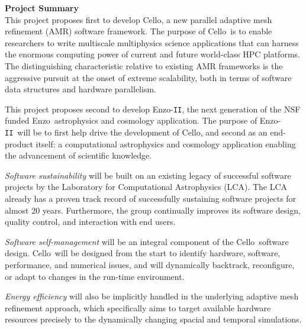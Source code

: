 \documentclass[11pt,letterpaper]{article}
\newcommand{\cello}{\textsf{Cello}}
\newcommand{\enzo}{\textsf{Enzo}}
\newcommand{\enzoii}{\textsf{Enzo}-\texttt{II}}
\begin{document}
\textbf{Project Summary} \\

%
%
%
%
This project proposes first to develop \cello, a new parallel adaptive
mesh refinement (AMR) software framework.  The purpose of \cello\ is
to enable researchers to write multiscale multiphysics science
applications that can harness the enormous computing power of current
and future world-class HPC platforms.  The distinguishing
characteristic relative to existing AMR frameworks is the aggressive
pursuit at the onset of extreme scalability, both in terms of software
data structures and hardware parallelism.

This project proposes second to develop \enzoii, the next generation
of the NSF funded \enzo\ astrophysics and cosmology application.  The
purpose of \enzoii\ will be to first help drive the development of
\cello, and second as an end-product itself: a computational
astrophysics and cosmology application enabling the advancement of
scientific knowledge.

\textit{Software sustainability} will be built on an existing legacy
of successful software projects by the Laboratory for Computational
Astrophysics (LCA).  The LCA already has a proven track record of
successfully sustaining software projects for almost $20$ years.
Furthermore, the group continually improves its software design,
quality control, and interaction with end users.

\textit{Software self-management} will be an integral component of the
\cello\ software design.  \cello\ will be designed from the start to
identify hardware, software, performance, and numerical issues, and
will dynamically backtrack, reconfigure, or adapt to changes in the
run-time environment.

\textit{Energy efficiency} will also be implicitly handled in the
underlying adaptive mesh refinement approach, which specifically aims
to target available hardware resources precisely to the dynamically
changing spacial and temporal simulations.


\end{document}

